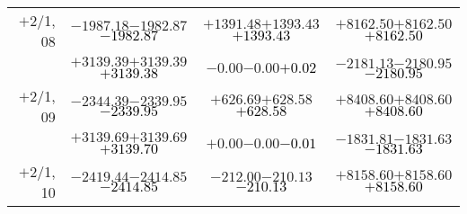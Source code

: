 \documentclass[compress]{beamer}
\begin{document}
\begin{frame}
{\begin{tabular}{r | c | c | c}
$+$2/1, 08 & $-1987.18$\hspace{0.1 cm}$-1982.87$\hspace{0.1 cm}\textcolor{black}{$-1982.87$} & $+1391.48$\hspace{0.1 cm}$+1393.43$\hspace{0.1 cm}\textcolor{black}{$+1393.43$} & $+8162.50$\hspace{0.1 cm}$+8162.50$\hspace{0.1 cm}\textcolor{black}{$+8162.50$} \\
           & $+3139.39$\hspace{0.1 cm}$+3139.39$\hspace{0.1 cm}\textcolor{black}{$+3139.38$} & $-0.00$\hspace{0.1 cm}$-0.00$\hspace{0.1 cm}\textcolor{black}{$+0.02$} & $-2181.13$\hspace{0.1 cm}$-2180.95$\hspace{0.1 cm}\textcolor{black}{$-2180.95$} \\
$+$2/1, 09 & $-2344.39$\hspace{0.1 cm}$-2339.95$\hspace{0.1 cm}\textcolor{black}{$-2339.95$} & $+626.69$\hspace{0.1 cm}$+628.58$\hspace{0.1 cm}\textcolor{black}{$+628.58$} & $+8408.60$\hspace{0.1 cm}$+8408.60$\hspace{0.1 cm}\textcolor{black}{$+8408.60$} \\
           & $+3139.69$\hspace{0.1 cm}$+3139.69$\hspace{0.1 cm}\textcolor{black}{$+3139.70$} & $+0.00$\hspace{0.1 cm}$-0.00$\hspace{0.1 cm}\textcolor{black}{$-0.01$} & $-1831.81$\hspace{0.1 cm}$-1831.63$\hspace{0.1 cm}\textcolor{black}{$-1831.63$} \\
$+$2/1, 10 & $-2419.44$\hspace{0.1 cm}$-2414.85$\hspace{0.1 cm}\textcolor{black}{$-2414.85$} & $-212.00$\hspace{0.1 cm}$-210.13$\hspace{0.1 cm}\textcolor{black}{$-210.13$} & $+8158.60$\hspace{0.1 cm}$+8158.60$\hspace{0.1 cm}\textcolor{black}{$+8158.60$} \\

\end{tabular}}
\end{frame}
\end{document}
